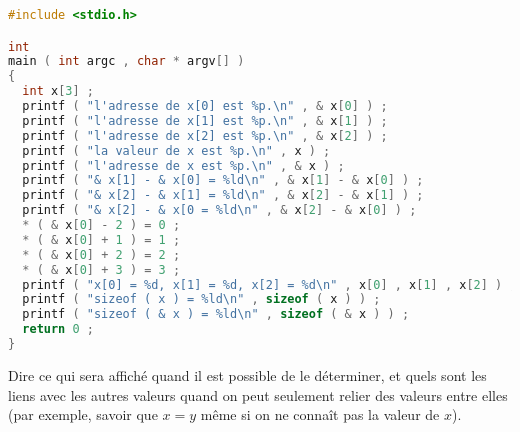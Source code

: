 
\begin{lstlisting}[language=C]
#include <stdio.h>

int
main ( int argc , char * argv[] )
{
  int x[3] ;
  printf ( "l'adresse de x[0] est %p.\n" , & x[0] ) ;
  printf ( "l'adresse de x[1] est %p.\n" , & x[1] ) ;
  printf ( "l'adresse de x[2] est %p.\n" , & x[2] ) ;
  printf ( "la valeur de x est %p.\n" , x ) ;
  printf ( "l'adresse de x est %p.\n" , & x ) ;
  printf ( "& x[1] - & x[0] = %ld\n" , & x[1] - & x[0] ) ;
  printf ( "& x[2] - & x[1] = %ld\n" , & x[2] - & x[1] ) ;
  printf ( "& x[2] - & x[0 = %ld\n" , & x[2] - & x[0] ) ;
  * ( & x[0] - 2 ) = 0 ;
  * ( & x[0] + 1 ) = 1 ;
  * ( & x[0] + 2 ) = 2 ;
  * ( & x[0] + 3 ) = 3 ;
  printf ( "x[0] = %d, x[1] = %d, x[2] = %d\n" , x[0] , x[1] , x[2] ) ;
  printf ( "sizeof ( x ) = %ld\n" , sizeof ( x ) ) ;
  printf ( "sizeof ( & x ) = %ld\n" , sizeof ( & x ) ) ;
  return 0 ;
}    
\end{lstlisting}

\question Dire ce qui sera affiché quand il est possible de le
déterminer, et quels sont les liens avec les autres valeurs quand on
peut seulement relier des valeurs entre elles (par exemple, savoir que
\(x = y\) même si on ne connaît pas la valeur de \(x\)).
